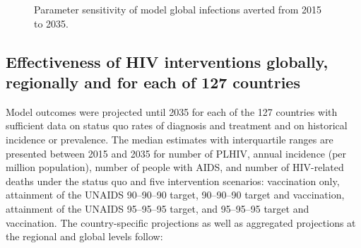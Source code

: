 \documentclass[11pt]{article}
\begin{document}
\begin{figure}
  \centering
  \caption{Parameter sensitivity of model global infections averted
    from 2015 to 2035.}
  \label{PRCCs}
\end{figure}


\subsection{Effectiveness of HIV interventions globally, regionally
  and for each of 127 countries}

Model outcomes were projected until 2035 for each of the 127 countries
with sufficient data on status quo rates of diagnosis and treatment
and on historical incidence or prevalence. The median estimates with
interquartile ranges are presented between 2015 and 2035 for number of
PLHIV, annual incidence (per million population), number of people
with AIDS, and number of HIV-related deaths under the status quo and
five intervention scenarios: vaccination only, attainment of the
UNAIDS 90--90--90 target, 90--90--90 target and vaccination, attainment of
the UNAIDS 95--95--95 target, and 95--95--95 target and vaccination.  The
country-specific projections as well as aggregated projections at the
regional and global levels follow:







\clearpage
%
\end{document}
